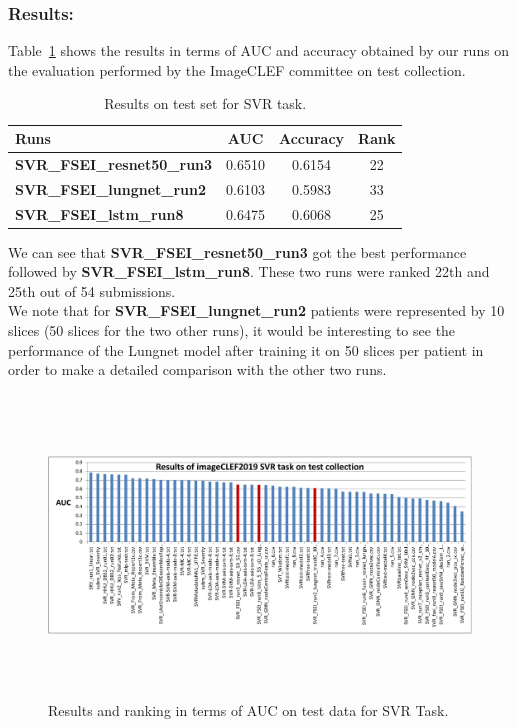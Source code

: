 \documentclass{llncs}
\begin{document}
\subsubsection{Results:}

Table~\ref{tab:resultstestsvr} shows the results in terms of AUC and accuracy obtained by our runs on the evaluation performed by the ImageCLEF committee on test collection.

\begin{table}
\center
\caption{Results on test set for SVR task.}
\label{tab:resultstestsvr}
\begin{tabular}{|l||c||c||c|}
\hline
Runs                        &    AUC        &     Accuracy    &    Rank        \\
\hline
 \textbf{SVR\_FSEI\_resnet50\_run3}            &    0.6510        &    0.6154        &    22        \\
 \textbf{SVR\_FSEI\_lungnet\_run2}            &    0.6103        &    0.5983        &    33        \\
 \textbf{SVR\_FSEI\_lstm\_run8}                &    0.6475        &    0.6068        &    25        \\
\hline
\end{tabular}
\end{table}

We can see that \textbf{SVR\_FSEI\_resnet50\_run3} got the best performance followed by  \textbf{SVR\_FSEI\_lstm\_run8}. These two runs were ranked 22th and 25th out of 54 submissions.\\

We note that for \textbf{SVR\_FSEI\_lungnet\_run2} patients were represented by 10 slices (50 slices for the two other runs), it would be interesting to see the performance of the Lungnet model after training it on 50 slices per patient in order to make a detailed comparison with the other two runs.



\begin{figure}[!ht]
\includegraphics[width=12cm,height=8cm]{results_svr_test_auc.pdf}
\caption{Results and ranking in terms of AUC on test data for SVR Task.} 
\label{fig:svrresultstestauc}
\end{figure}
\end{document}
